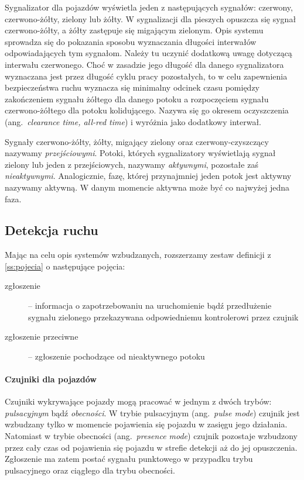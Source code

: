 \documentclass{pracamgr}
\newcommand{\ang}[1]{(ang.~\emph{#1})}
\theoremstyle{plain}
\begin{document}
Sygnalizator dla pojazdów wyświetla jeden z następujących sygnałów:
czerwony, czerwono-żółty, zielony lub żółty. W sygnalizacji dla
pieszych opuszcza się sygnał czerwono-żółty, a żółty zastępuje się
migającym zielonym. Opis systemu sprowadza się do pokazania sposobu
wyznaczania długości interwałów odpowiadających tym sygnałom. Należy
tu uczynić dodatkową uwagę dotyczącą interwału czerwonego. Choć w
zasadzie jego długość dla danego sygnalizatora wyznaczana jest przez
długość cyklu pracy pozostałych, to w celu zapewnienia bezpieczeństwa
ruchu wyznacza się minimalny odcinek czasu pomiędzy zakończeniem
sygnału żółtego dla danego potoku a rozpoczęciem sygnału
czerwono-żółtego dla potoku kolidującego. Nazywa się go okresem
oczyszczenia \ang{clearance time, all-red time} i wyróżnia jako
dodatkowy interwał.

Sygnały czerwono-żółty, żółty, migający zielony oraz
czerwony-czyszczący nazywamy \emph{przejściowymi}. Potoki, których
sygnalizatory wyświetlają sygnał zielony lub jeden z przejściowych,
nazywamy \emph{aktywnymi}, pozostałe zaś
\emph{nieaktywnymi}. Analogicznie, fazę, której przynajmniej jeden
potok jest aktywny nazywamy aktywną. W danym momencie aktywna może być
co najwyżej jedna faza.

\subsection{Detekcja ruchu}
\label{ss:detekcja} Mając na celu opis systemów wzbudzanych,
rozszerzamy zestaw definicji z \ref{ss:pojecia} o następujące
pojęcia:
\begin{description}
  \item[zgłoszenie] -- informacja o zapotrzebowaniu na uruchomienie
bądź przedłużenie sygnału zielonego przekazywana odpowiedniemu
kontrolerowi przez czujnik
  \item[zgłoszenie przeciwne] -- zgłoszenie pochodzące od nieaktywnego
potoku
\end{description}

\paragraph{Czujniki dla pojazdów} Czujniki wykrywające pojazdy mogą
pracować w jednym z dwóch trybów: \emph{pulsacyjnym} bądź
\emph{obecności}.  W trybie pulsacyjnym \ang{pulse mode} czujnik jest
wzbudzany tylko w momencie pojawienia się pojazdu w zasięgu jego
działania.  Natomiast w trybie obecności \ang{presence mode} czujnik
pozostaje wzbudzony przez cały czas od pojawienia się pojazdu w
strefie detekcji aż do jej opuszczenia. Zgłoszenie ma zatem postać
sygnału punktowego w przypadku trybu pulsacyjnego oraz ciągłego dla
trybu obecności.
\end{document}
